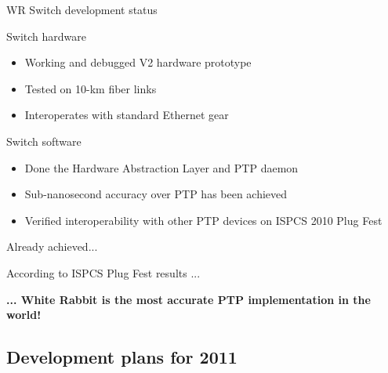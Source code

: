 \documentclass[compress,red]{beamer}
\begin{document}
\begin{frame}{WR Switch development status}
	\begin{block}{Switch hardware}
          \begin{itemize}
            \item Working and debugged V2 hardware prototype
            \item Tested on 10-km fiber links
            \item Interoperates with standard Ethernet gear
            \end{itemize}
            \end{block}

	\begin{block}{Switch software}
          \begin{itemize}
            \item Done the Hardware Abstraction Layer and PTP daemon
            \item Sub-nanosecond accuracy over PTP has been achieved
            \item Verified interoperability with other PTP devices on ISPCS 2010 Plug Fest
            \end{itemize}
          \end{block}
\end{frame}

\begin{frame}{Already achieved...}
  \begin{block}{According to ISPCS Plug Fest results ...}
    \begin{center}
      \textbf{... White Rabbit is the most accurate PTP implementation in the world!}
  \end{center}
  \end{block}
\end{frame}

\subsection{Development plans for 2011}
\end{document}
